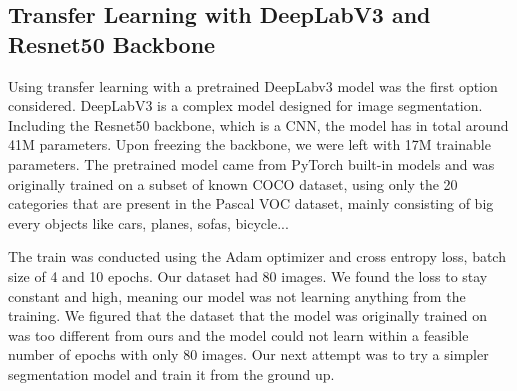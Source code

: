 \subsection{Transfer Learning with DeepLabV3 and Resnet50 Backbone}

Using transfer learning with a pretrained DeepLabv3 model was the first option considered. DeepLabV3 is a complex model designed for
image segmentation. Including the Resnet50 backbone, which is a CNN, the model has in total around 41M parameters. Upon freezing the
backbone, we were left with 17M trainable parameters. The pretrained model came from PyTorch built-in models and was originally trained
on a subset of known COCO dataset, using only the 20 categories that are present in the Pascal VOC dataset, mainly consisting of big
every objects like cars, planes, sofas, bicycle...

The train was conducted using the Adam optimizer and cross entropy loss, batch size of 4 and 10 epochs. Our dataset had 80 images. We
found the loss to stay constant and high, meaning our model was not learning anything from the training. We figured that the dataset
that the model was originally trained on was too different from ours and the model could not learn within a feasible number of epochs
with only 80 images. Our next attempt was to try a simpler segmentation model and train it from the ground up.
